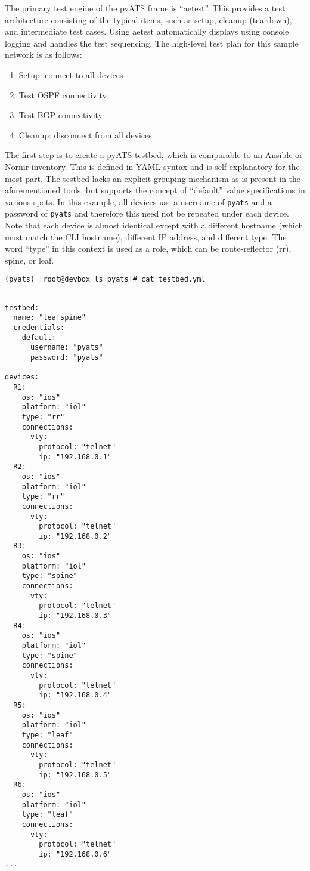 
The primary test engine of the pyATS frame is ``aetest''. This provides
a test architecture consisting of the typical items, such as setup, cleanup
(teardown), and intermediate test cases. Using aetest automatically displays
using console logging and handles the test sequencing. The high-level test
plan for this sample network is as follows:

\begin{enumerate}
  \item Setup: connect to all devices
  \item Test OSPF connectivity
  \item Test BGP connectivity
  \item Cleanup: disconnect from all devices
\end{enumerate}

The first step is to create a pyATS testbed, which is comparable to an Ansible
or Nornir inventory. This is defined in YAML syntax and is self-explanatory
for the most part. The testbed lacks an explicit grouping mechanism as is
present in the aforementioned tools, but supports the concept of ``default''
value specifications in various spots. In this example, all devices use
a username of \verb|pyats| and a password of \verb|pyats| and therefore this
need not be repeated under each device. Note that each device is almost
identical except with a different hostname (which must match the CLI hostname),
different IP address, and different type. The word ``type'' in this context
is used as a role, which can be route-reflector (rr), spine, or leaf.

\begin{verbatim}
(pyats) [root@devbox ls_pyats]# cat testbed.yml
\end{verbatim}

\begin{verbatim}
---
testbed:
  name: "leafspine"
  credentials:
    default:
      username: "pyats"
      password: "pyats"

devices:
  R1:
    os: "ios"
    platform: "iol"
    type: "rr"
    connections:
      vty:
        protocol: "telnet"
        ip: "192.168.0.1"
  R2:
    os: "ios"
    platform: "iol"
    type: "rr"
    connections:
      vty:
        protocol: "telnet"
        ip: "192.168.0.2"
  R3:
    os: "ios"
    platform: "iol"
    type: "spine"
    connections:
      vty:
        protocol: "telnet"
        ip: "192.168.0.3"
  R4:
    os: "ios"
    platform: "iol"
    type: "spine"
    connections:
      vty:
        protocol: "telnet"
        ip: "192.168.0.4"
  R5:
    os: "ios"
    platform: "iol"
    type: "leaf"
    connections:
      vty:
        protocol: "telnet"
        ip: "192.168.0.5"
  R6:
    os: "ios"
    platform: "iol"
    type: "leaf"
    connections:
      vty:
        protocol: "telnet"
        ip: "192.168.0.6"
...
\end{verbatim}

